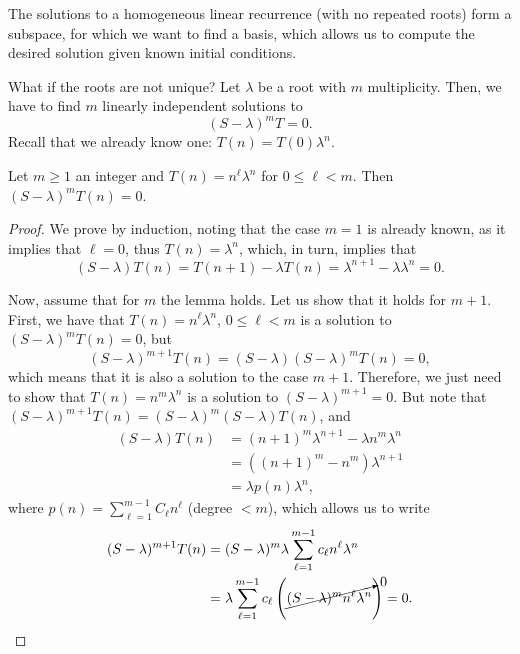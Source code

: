 
\begin{previouslyseen}
    The solutions to a homogeneous linear recurrence (with no repeated roots) form a subspace, for which we want to find a basis, which allows us to compute the desired solution given known initial conditions.
\end{previouslyseen}

What if the roots are not unique? Let $\lambda$ be a root with $m$ multiplicity.
Then, we have to find $m$ linearly independent solutions to \[
\left( S - \lambda \right)^{m} T = 0
.\] Recall that we already know one: $T(n) = T(0)\lambda^{n}$.

\begin{lemma}
    Let $m\ge 1$ an integer and $T(n)=n^{\ell}\lambda^{n}$ for $0\le \ell < m$.
    Then $(S-\lambda)^{m}T(n) = 0$.
\end{lemma}
\begin{proof}
    We prove by induction, noting that the case $m=1$ is already known, as it implies that $\ell=0$, thus $T(n)=\lambda^{n}$, which, in turn, implies that \[
	(S-\lambda)T(n) = T(n+1) - \lambda T(n) = \lambda^{n+1} - \lambda \lambda^{n} = 0
    .\]

    Now, assume that for $m$ the lemma holds. Let us show that it holds for  $m+1$.
    First, we have that $T(n)=n^{\ell}\lambda^{n}$, $0\le \ell < m$ is a solution to $(S-\lambda)^{m}T(n) = 0$, but \[
	(S-\lambda)^{m+1}T(n) = (S-\lambda)(S-\lambda)^{m}T(n) = 0
    ,\] which means that it is also a solution to the case $m+1$.
    Therefore, we just need to show that $T(n) = n^{m}\lambda^{n}$ is a solution to $(S-\lambda)^{m+1}=0$.
    But note that $(S-\lambda)^{m+1} T(n) = (S-\lambda)^{m} (S-\lambda) T(n)$, and
    \begin{align*}
	(S-\lambda) T(n) &= (n+1)^{m}\lambda^{n+1} - \lambda n^{m} \lambda^{n}  \\
	&= \left( (n+1)^{m} - n^{m} \right)\lambda^{n+1}  \\
	&= \lambda p(n) \lambda^{n}
    ,\end{align*}
    where $p(n) = \sum_{\ell=1}^{m-1} C_\ell n^{\ell}$ (degree $<m$), which allows us to write
    \begin{align*}
        (S-\lambda)^{m+1} T(n) &=  (S-\lambda)^{m} \lambda\sum_{\ell =1}^{m-1} c_\ell n^{\ell}\lambda^{n} \\
&= \lambda \sum_{\ell=1}^{m-1} c_\ell \left( \cancelto{0}{(S-\lambda)^{m}n^{\ell}\lambda^{n}} \right) = 0
    .\end{align*}
\end{proof}

